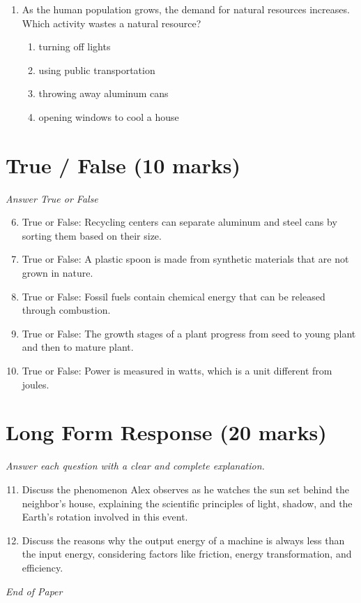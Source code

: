 \documentclass[12pt]{article}
\begin{document}
\begin{enumerate}[label=\arabic*.]
\begin{enumerate}[label=(\alph*)]
    \item The distance is a rough estimate.
    \item Only light can travel between stars.
    \item Light signals were timed reflecting from the star.
\end{enumerate}
\item As the human population grows, the demand for natural resources increases. Which activity wastes a natural resource?
\begin{enumerate}[label=(\alph*)]
    \item turning off lights
    \item using public transportation
    \item throwing away aluminum cans
    \item opening windows to cool a house
\end{enumerate}
\end{enumerate}

\section*{True / False (10 marks)}
\textit{Answer True or False}
\begin{enumerate}[label=\arabic*.]
\setcounter{enumi}{5}
\item True or False: Recycling centers can separate aluminum and steel cans by sorting them based on their size.
\item True or False: A plastic spoon is made from synthetic materials that are not grown in nature.
\item True or False: Fossil fuels contain chemical energy that can be released through combustion.
\item True or False: The growth stages of a plant progress from seed to young plant and then to mature plant.
\item True or False: Power is measured in watts, which is a unit different from joules.
\end{enumerate}

\section*{Long Form Response (20 marks)}
\textit{Answer each question with a clear and complete explanation.}
\begin{enumerate}[label=\arabic*.]
\setcounter{enumi}{10}
\item Discuss the phenomenon Alex observes as he watches the sun set behind the neighbor's house, explaining the scientific principles of light, shadow, and the Earth's rotation involved in this event.
\item Discuss the reasons why the output energy of a machine is always less than the input energy, considering factors like friction, energy transformation, and efficiency.
\end{enumerate}

\vfill
\noindent\textit{End of Paper}
\end{document}
